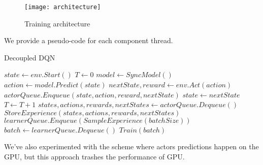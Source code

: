 \begin{figure}[h!]
\caption{Training architecture}
\texttt{[image: architecture]}
\end{figure}

We provide a pseudo-code for each component thread.
\begin{algorithm}
    \caption{Decoupled DQN}\label{actor}
    \begin{algorithmic}
            \State $state \gets env.Start()$
            \State $T \gets 0$
                    \State $model \gets SyncModel()$
                \EndIf
                \State $action \gets model.Predict(state)$
                \State $nextState, reward \gets env.Act(action)$
                \State $actorQueue.Enqueue(state, action, reward, nextState)$
                \State $state \gets nextState$
                \State $T \gets T + 1$
            \EndWhile
        \EndProcedure
        \Statex
                \State $states, actions, rewards, nextStates \gets actorQueue.Dequeue()$
                \State $StoreExperience(states, actions, rewards, nextStates)$
                \State $learnerQueue.Enqueue(SampleExperience(batchSize))$
            \EndWhile
        \EndProcedure
        \Statex
                \State $batch \gets learnerQueue.Dequeue()$
                \State $Train(batch)$
            \EndFor
        \EndProcedure
    \end{algorithmic}
\end{algorithm}

We've also experimented with the scheme where actors predictions happen on the GPU, but this
approach trashes the performance of GPU. %

